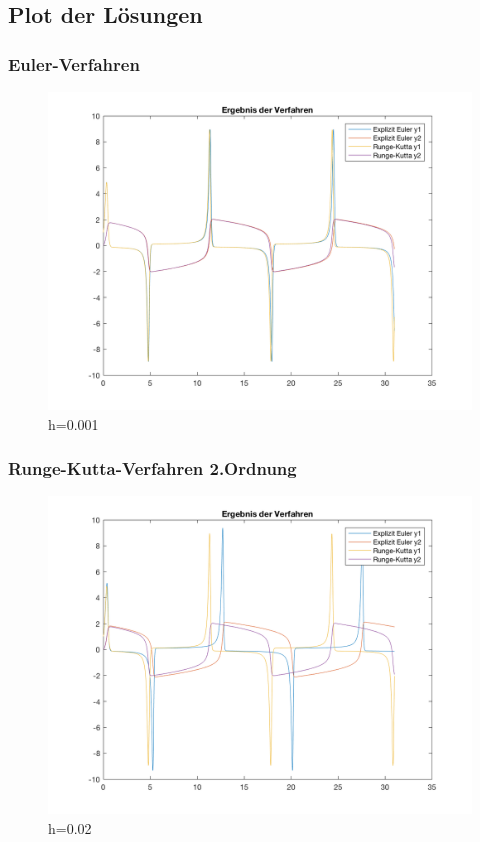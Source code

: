 \documentclass[]{scrartcl}
\begin{document}
\subsection{Plot der Lösungen}
\subsubsection{Euler-Verfahren}
\begin{figure}
\centering
\includegraphics[width=0.7\linewidth]{a1_2_1}
\caption{h=0.001}
\label{fig:a1_2_1}
\end{figure}


\subsubsection{Runge-Kutta-Verfahren 2.Ordnung}
\begin{figure}
	\centering
	\includegraphics[width=0.7\linewidth]{a1_2_2}
	\caption{h=0.02}
	\label{fig:a1_2_2}
\end{figure}
\end{document}
